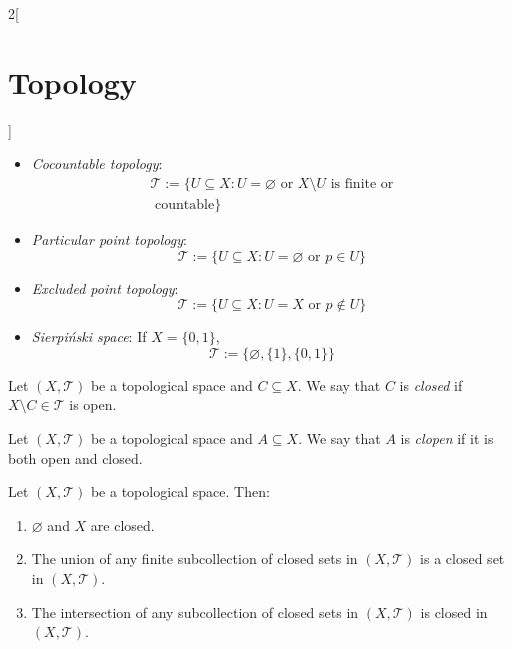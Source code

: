 \documentclass[../../../main.tex]{subfiles}
\begin{document}
\begin{multicols}{2}[\section{Topology}]
\begin{prop}
\begin{itemize}
      \item \textit{Cocountable topology}:
            \begin{multline*}
              \mathcal{T}:=\{U\subseteq X:U=\varnothing\text{ or }X\setminus U\text{ is finite or}\\\text{ countable}\}
            \end{multline*}
      \item \textit{Particular point topology}: $$\mathcal{T}:=\{U\subseteq X:U=\varnothing\text{ or }p\in U\}$$
      \item \textit{Excluded point topology}: $$\mathcal{T}:=\{U\subseteq X:U=X\text{ or }p\notin U\}$$
      \item \textit{Sierpiński space}: If $X=\{0,1\}$, $$\mathcal{T}:=\{\varnothing,\{1\},\{0,1\}\}$$
    \end{itemize}
  \end{prop}
  \begin{definition}
    Let $(X,\mathcal{T})$ be a topological space and $C\subseteq X$. We say that $C$ is \textit{closed} if $X\setminus C\in\mathcal{T}$ is open.
  \end{definition}
  \begin{definition}
    Let $(X,\mathcal{T})$ be a topological space and $A\subseteq X$. We say that $A$ is \textit{clopen} if it is both open and closed.
  \end{definition}
  \begin{prop}
    Let $(X,\mathcal{T})$ be a topological space. Then:
    \begin{enumerate}
      \item $\varnothing$ and $X$ are closed.
      \item The union of any finite subcollection of closed sets in $(X,\mathcal{T})$ is a closed set in $(X,\mathcal{T})$.
      \item The intersection of any subcollection of closed sets in $(X,\mathcal{T})$ is closed in $(X,\mathcal{T})$.
    \end{enumerate}
  \end{prop}

\end{multicols}
\end{document}
